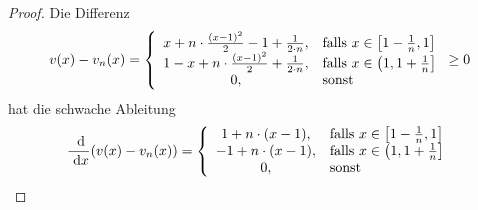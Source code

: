 \documentclass[12pt,a4paper]{article}
\begin{document}
\begin{proof}
Die Differenz
\begin{align*}
v(x)-v_n(x)=\left\lbrace\begin{array}{cl}
x+n\cdot\frac{(x-1)^2}{2}-1+\frac{1}{2\cdot n}, & \text{falls } x\in\left[1-\frac{1}{n},1\right]\\
1-x+n\cdot\frac{(x-1)^2}{2}+\frac{1}{2\cdot n}, & \text{falls } x\in\left(1,1+\frac{1}{n}\right]\\
0,&\text{sonst }
\end{array}\right.\stackrel{\text{}}{\geq}0\\
\end{align*}
hat die schwache Ableitung
\begin{align*}
\frac{\text{ d}}{\text{ d} x}(v(x)-v_n(x))=\left\lbrace\begin{array}{cl}
1+n\cdot(x-1), & \text{falls } x\in\left[1-\frac{1}{n},1\right]\\
-1+n\cdot(x-1), & \text{falls } x\in\left(1,1+\frac{1}{n}\right]\\
0,&\text{sonst }
\end{array}\right.
\end{align*}


\end{proof}
\end{document}
